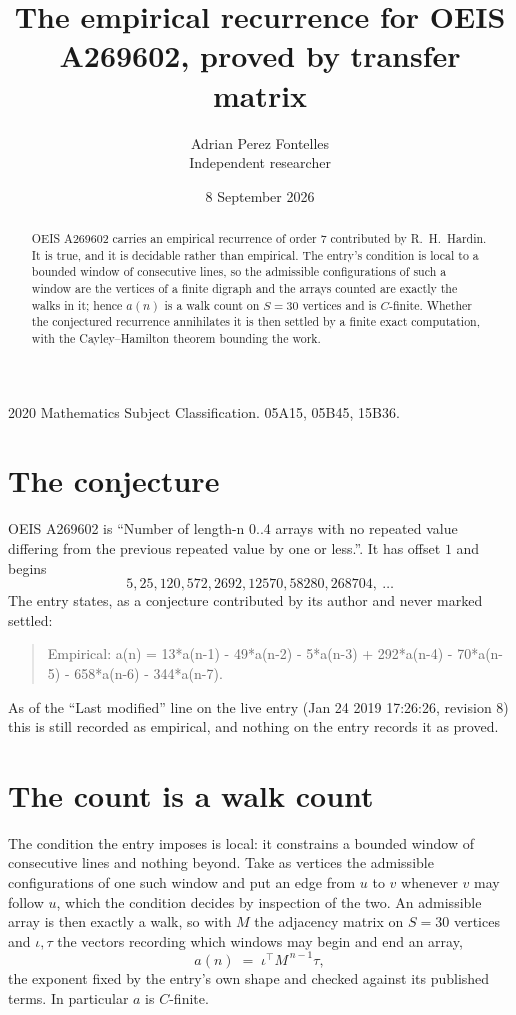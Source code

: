 \documentclass[11pt,a4paper]{article}
\title{The empirical recurrence for OEIS A269602, proved by transfer matrix}
\author{Adrian Perez Fontelles\\ \small Independent researcher}
\date{8 September 2026}
\theoremstyle{plain}
\theoremstyle{definition}
\begin{document}
\maketitle

\begin{abstract}
OEIS A269602 carries an empirical recurrence of order $7$ contributed by R.~H.~Hardin. It is
true, and it is decidable rather than empirical. The entry's condition is local to a bounded window of consecutive lines, so
the admissible configurations of such a window are the vertices of a finite digraph and the
arrays counted are exactly the walks in it; hence $a(n)$ is a walk count on $S=30$ vertices
and is $C$-finite. Whether the conjectured recurrence annihilates it is then settled by a
finite exact computation, with the Cayley--Hamilton theorem bounding the work.
\end{abstract}

\noindent\small 2020 Mathematics Subject Classification. 05A15, 05B45, 15B36.\normalsize

\section{The conjecture}

OEIS A269602 is ``Number of length-n 0..4 arrays with no repeated value differing from the previous repeated value by one or less.''. It has offset $1$ and begins
\[
5, 25, 120, 572, 2692, 12570, 58280, 268704,\ \dots
\]
The entry states, as a conjecture contributed by its author and never marked settled:
\begin{quote}
Empirical: a(n) = 13*a(n-1) - 49*a(n-2) - 5*a(n-3) + 292*a(n-4) - 70*a(n-5) - 658*a(n-6) - 344*a(n-7).
\end{quote}
As of the ``Last modified'' line on the live entry (Jan 24 2019 17:26:26, revision 8) this is still
recorded as empirical, and nothing on the entry records it as proved.

\section{The count is a walk count}

The condition the entry imposes is local: it constrains a bounded window of consecutive lines and nothing beyond. Take as
vertices the admissible configurations of one such window and put an edge from $u$ to $v$
whenever $v$ may follow $u$, which the condition decides by inspection of the two. An
admissible array is then exactly a walk, so with $M$ the adjacency matrix on $S=30$ vertices
and $\iota,\tau$ the vectors recording which windows may begin and end an array,
\[
a(n)\;=\;\iota^{\!\top}M^{\,n-1}\tau ,
\]
the exponent fixed by the entry's own shape and checked against its published terms. In
particular $a$ is $C$-finite.
\end{document}
